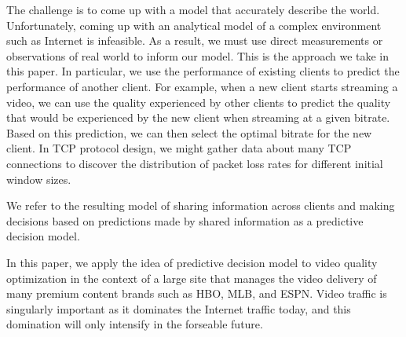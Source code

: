 The challenge is to come up with a model that accurately describe the
world. Unfortunately, coming up with an analytical model of a complex
environment such as Internet is infeasible. As a result, we must use
direct measurements or observations of real world to inform our
model. This is the approach we take in this paper. In particular, we
use the performance of existing clients to predict the performance of
another client. For example, when a new client starts streaming a
video, we can use the quality experienced by other clients to predict
the quality that would be experienced by the new client when streaming
at a given bitrate. Based on this prediction, we can then select the
optimal bitrate for the new client.  In TCP protocol design, we might
gather data about many TCP connections to discover the distribution of
packet loss rates for different initial window sizes.  

We refer to the resulting model of sharing information
across clients and making decisions based on predictions made by
shared information as a predictive decision model. 




In this paper, we apply the idea of predictive decision model to video
quality optimization in the context of a large site that manages the
video delivery of many premium content brands such as HBO, MLB, and
ESPN. Video traffic is singularly important as it dominates the
Internet traffic today, and this domination will only intensify in the
forseable future.

